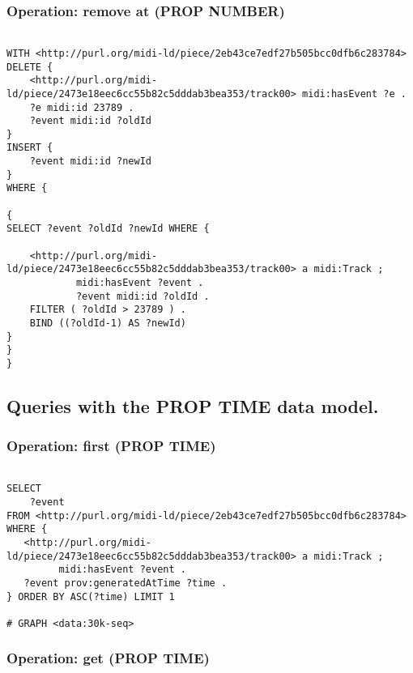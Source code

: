 \subsubsection{Operation: remove at (PROP NUMBER)}
\label{query:PROP\-NUMBER:remove_at}

\begin{lstlisting}[language=sparql]

WITH <http://purl.org/midi-ld/piece/2eb43ce7edf27b505bcc0dfb6c283784>
DELETE {
	<http://purl.org/midi-ld/piece/2473e18eec6cc55b82c5dddab3bea353/track00> midi:hasEvent ?e .
	?e midi:id 23789 .
	?event midi:id ?oldId
}
INSERT {
	?event midi:id ?newId	
}
WHERE {

{
SELECT ?event ?oldId ?newId WHERE {

	<http://purl.org/midi-ld/piece/2473e18eec6cc55b82c5dddab3bea353/track00> a midi:Track ;
			midi:hasEvent ?event .
			?event midi:id ?oldId .
	FILTER ( ?oldId > 23789 ) .
	BIND ((?oldId-1) AS ?newId)
}
}
}

\end{lstlisting}


\subsection{Queries with the PROP TIME data model.}
\label{queries:PROP-TIME}

\subsubsection{Operation: first (PROP TIME)}
\label{query:PROP\-TIME:first}

\begin{lstlisting}[language=sparql]

SELECT
	?event
FROM <http://purl.org/midi-ld/piece/2eb43ce7edf27b505bcc0dfb6c283784>
WHERE {
   <http://purl.org/midi-ld/piece/2473e18eec6cc55b82c5dddab3bea353/track00> a midi:Track ;
         midi:hasEvent ?event .
   ?event prov:generatedAtTime ?time .
} ORDER BY ASC(?time) LIMIT 1

# GRAPH <data:30k-seq>

\end{lstlisting}

\subsubsection{Operation: get (PROP TIME)}
\label{query:PROP\-TIME:get}

